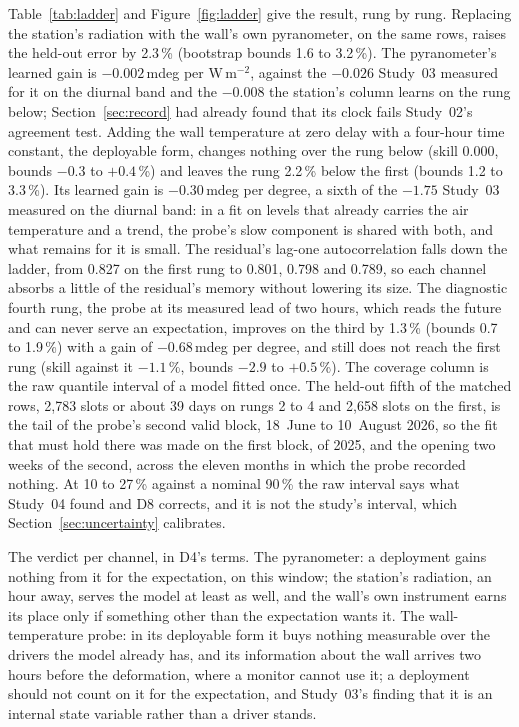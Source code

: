 \documentclass[11pt,a4paper]{article}
\begin{document}
Table~\ref{tab:ladder} and Figure~\ref{fig:ladder} give the result, rung by
rung. Replacing the station's radiation with the wall's own pyranometer, on
the same rows, raises the held-out error by 2.3\,\% (bootstrap bounds 1.6 to
3.2\,\%). The pyranometer's learned gain is $-0.002$\,mdeg per W\,m$^{-2}$,
against the $-0.026$ Study~03 measured for it on the diurnal band and the
$-0.008$ the station's column learns on the rung below; Section~\ref{sec:record}
had already found that its clock fails Study~02's agreement test. Adding the
wall temperature at zero delay with a four-hour time constant, the deployable
form, changes nothing over the rung below (skill 0.000, bounds $-0.3$ to
$+0.4$\,\%) and leaves the rung 2.2\,\% below the first (bounds 1.2 to
3.3\,\%). Its learned gain is $-0.30$\,mdeg per degree, a sixth of the
$-1.75$ Study~03 measured on the diurnal band: in a fit on levels that
already carries the air temperature and a trend, the probe's slow component
is shared with both, and what remains for it is small. The residual's
lag-one autocorrelation falls down the ladder, from 0.827 on the first rung
to 0.801, 0.798 and 0.789, so each channel absorbs a little of the residual's
memory without lowering its size. The diagnostic fourth rung, the probe at
its measured lead of two hours, which reads the future and can never serve
an expectation, improves on the third by 1.3\,\% (bounds 0.7 to 1.9\,\%) with
a gain of $-0.68$\,mdeg per degree, and still does not reach the first rung
(skill against it $-1.1$\,\%, bounds $-2.9$ to $+0.5$\,\%). The coverage
column is the raw quantile interval of a model fitted once. The held-out
fifth of the matched rows, 2,783 slots or about 39 days on rungs 2 to 4 and
2,658 slots on the first, is the tail of the probe's second valid block, 18~June
to 10~August 2026, so the fit that must hold there was made on the first block,
of 2025, and the opening two weeks of the second, across the eleven months in
which the probe recorded nothing. At 10 to 27\,\% against a nominal 90\,\%
the raw interval says what Study~04 found and D8 corrects, and it is not the
study's interval, which Section~\ref{sec:uncertainty} calibrates.

The verdict per channel, in D4's terms. The pyranometer: a deployment gains
nothing from it for the expectation, on this window; the station's radiation,
an hour away, serves the model at least as well, and the wall's own instrument
earns its place only if something other than the expectation wants it. The
wall-temperature probe: in its deployable form it buys nothing measurable over
the drivers the model already has, and its information about the wall arrives
two hours before the deformation, where a monitor cannot use it; a deployment
should not count on it for the expectation, and Study~03's finding that it is
an internal state variable rather than a driver stands.
\end{document}
